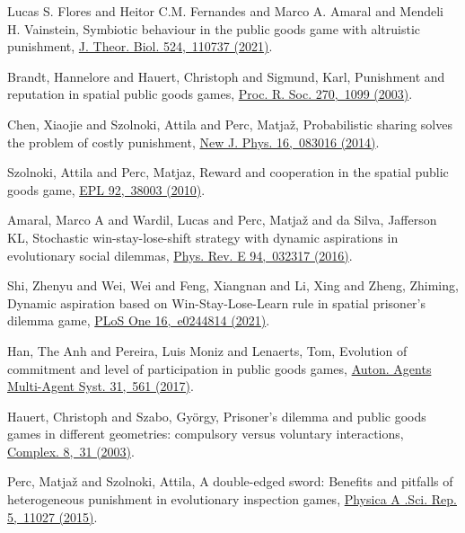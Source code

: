 \documentclass[twocolumn,aps,amsmath,pre,floatfix,superscriptaddress]{revtex4-2}
\begin{document}
\begin{thebibliography}{10}
Lucas S. Flores and Heitor C.M. Fernandes and Marco A. Amaral and Mendeli H. Vainstein,
{Symbiotic behaviour in the public goods game with altruistic punishment},
\href {https://doi.org/10.1016/j.jtbi.2021.110737}
{J. Theor. Biol. 524,~110737 (2021)}.

Brandt, Hannelore and Hauert, Christoph and Sigmund, Karl,
{Punishment and reputation in spatial public goods games},
\href {https://doi.org/10.1098/rspb.2003.2336}
{Proc. R. Soc. 270,~1099 (2003)}.

Chen, Xiaojie and Szolnoki, Attila and Perc, Matja{\v{z}},
{Probabilistic sharing solves the problem of costly punishment},
\href {https://doi.org/10.1088/1367-2630/16/8/083016}
{New J. Phys. 16,~083016 (2014)}.

Szolnoki, Attila and Perc, Matjaz,
{Reward and cooperation in the spatial public goods game},
\href {https://doi.org/10.1209/0295-5075/92/38003}
{EPL 92,~38003 (2010)}.

Amaral, Marco A and Wardil, Lucas and Perc, Matja{\v{z}} and da Silva, Jafferson KL,
{Stochastic win-stay-lose-shift strategy with dynamic aspirations in evolutionary social dilemmas},
\href {https://doi.org/10.1103/PhysRevE.94.032317}
{Phys. Rev. E 94,~032317  (2016)}.

Shi, Zhenyu and Wei, Wei and Feng, Xiangnan and Li, Xing and Zheng, Zhiming,
{Dynamic aspiration based on Win-Stay-Lose-Learn rule in spatial prisoner’s dilemma game},
\href {https://doi.org/10.1371/journal.pone.0244814}
{PLoS One 16,~e0244814 (2021)}.

Han, The Anh and Pereira, Luis Moniz and Lenaerts, Tom,
{Evolution of commitment and level of participation in public goods games},
\href {https://doi.org/10.1007/s10458-016-9338-4}
{Auton. Agents Multi-Agent Syst. 31,~561 (2017)}.

Hauert, Christoph and Szabo, Gy{\"o}rgy,
{Prisoner's dilemma and public goods games in different geometries: compulsory versus voluntary interactions},
\href {https://doi.org/10.1002/cplx.10092}
{Complex. 8,~31 (2003)}.

Perc, Matja{\v{z}} and Szolnoki, Attila,
{A double-edged sword: Benefits and pitfalls of heterogeneous punishment in evolutionary inspection games},
\href {https://doi.org/10.1038/srep11027}
{Physica A .Sci. Rep. 5,~11027 (2015)}.


\end{thebibliography}
\end{document}
